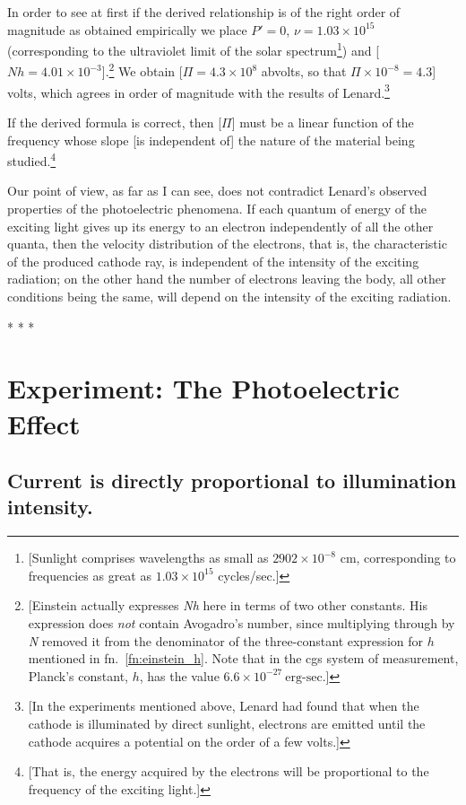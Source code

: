 In order to see at first if the derived relationship is of the right
order of magnitude as obtained empirically we place $P' = 0$,
$\nu = 1.03\times 10^{15}$ (corresponding to the ultraviolet limit of the
solar spectrum\footnote{{[}Sunlight comprises wavelengths as small as
  $2902\times 10^{-8}$ cm, corresponding to frequencies as great as $1.03\times 10^{15}$
  cycles/sec.{]}}) and {[}$Nh = 4.01\times 10^{-3}${]}.\footnote{{[}Einstein
  actually expresses \emph{Nh} here in terms of two other constants. His
  expression does \emph{not} contain Avogadro's number, since
  multiplying through by \emph{N} removed it from the denominator of the
  three-constant expression for $h$ mentioned in fn.\ \ref{fn:einstein_h}. 
  Note that in the cgs system of 
  measurement, Planck’s constant, $h$, has the value $6.6\times 10^{-27}\ \text{erg-sec}$.{]}} We
obtain {[}$\Pi = 4.3\times 10^8$ abvolts, so that $\Pi\times 10^{-8} =
4.3${]} volts, which agrees in order of magnitude with the results of
Lenard.\footnote{{[}In the experiments mentioned above, Lenard
  had found that when the cathode is illuminated by direct sunlight,
  electrons are emitted until the cathode acquires a potential on the
  order of a few volts.{]}}

If the derived formula is correct, then {[}$\Pi${]} must be a linear
function of the frequency whose slope {[}is independent of{]} the nature
of the material being studied.\footnote{{[}That is, the energy acquired
  by the electrons will be proportional to the frequency of the exciting
  light.{]}}

Our point of view, as far as I can see, does not contradict Lenard's
observed properties of the photoelectric phenomena. If each quantum of
energy of the exciting light gives up its energy to an electron
independently of all the other quanta, then the velocity distribution of
the electrons, that is, the characteristic of the produced cathode ray,
is independent of the intensity of the exciting radiation; on the other
hand the number of electrons leaving the body, all other conditions
being the same, will depend on the intensity of the exciting 
radiation.\\
\centerline{* * *}

\section*{Experiment: The Photoelectric Effect}

\subsection{Current is directly proportional to illumination intensity.}

